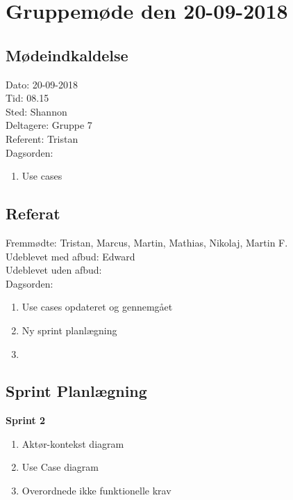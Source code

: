 \section{Gruppemøde den 20-09-2018}
\subsection{Mødeindkaldelse}
Dato: 20-09-2018
\\Tid: 08.15
\\Sted: Shannon 
\\Deltagere: Gruppe 7
\\Referent: Tristan
\\Dagsorden:
\begin{enumerate}
    \item Use cases
\end{enumerate}

\subsection{Referat}
 Fremmødte: Tristan, Marcus, Martin, Mathias, Nikolaj, Martin F. 
 \\Udeblevet med afbud: Edward
 \\Udeblevet uden afbud: 
 \\Dagsorden: 
 \begin{enumerate}
    \item Use cases opdateret og gennemgået
    \item Ny sprint planlægning 
    \item 
\end{enumerate}

\subsection{Sprint Planlægning}
\textbf{Sprint 2}
\begin{enumerate}
    \item Aktør-kontekst diagram
    \item Use Case diagram
    \item Overordnede ikke funktionelle krav
\end{enumerate}
